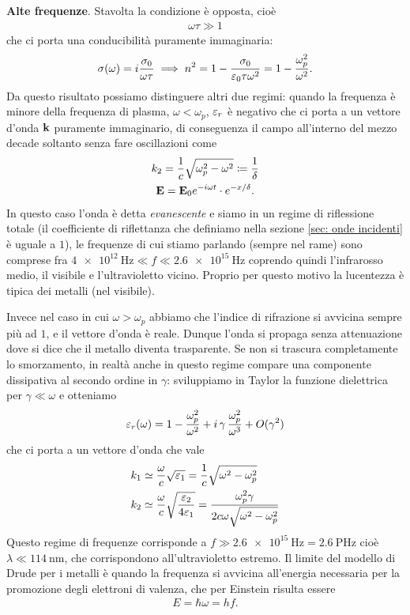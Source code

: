 \textbf{Alte frequenze}. Stavolta la condizione è opposta, cioè
\begin{align}
  \omega \tau \gg 1
\end{align}
che ci porta una conducibilità puramente immaginaria:
\begin{align}
  \sigma(\omega) = i \frac{\sigma_0}{\omega \tau} \implies n^2 = 1  - \frac{\sigma_0}{\varepsilon_0 \tau \omega^2} = 1 - \frac{\omega_p^2}{\omega^2}.
\end{align}
Da questo risultato possiamo distinguere altri due regimi: quando la frequenza è minore della frequenza di plasma, $ \omega < \omega_p $, $ \varepsilon_r $ è 
negativo che ci porta a un vettore d'onda $ \mathbf{k} $ puramente immaginario, di conseguenza il campo all'interno del mezzo decade soltanto senza fare 
oscillazioni come
\begin{gather}
  k_2 = \frac{1}{c} \sqrt{\omega_p^2 - \omega^2} \coloneq \frac{1}{\delta}
  \\
  \mathbf{E} = \mathbf{E}_0 e^{-i\omega t} \cdot e^{-x/\delta}.
\end{gather}
In questo caso l'onda è detta \textit{evanescente} e siamo in un regime di riflessione totale (il coefficiente di riflettanza che definiamo nella sezione 
\ref{sec: onde incidenti} è uguale a $ 1 $), le frequenze di cui stiamo parlando (sempre nel rame) sono comprese fra 
$ \SI{4e12}{\Hz} \ll f \ll \SI{2.6e15}{\Hz} $ coprendo quindi l'infrarosso medio, il visibile e l'ultravioletto vicino. Proprio per questo motivo la 
lucentezza è tipica dei metalli (nel visibile).

Invece nel caso in cui $ \omega > \omega_p $ abbiamo che l'indice di rifrazione si avvicina sempre più ad $ 1 $, e il vettore d'onda è reale. Dunque 
l'onda si propaga senza attenuazione dove si dice che il metallo diventa trasparente. Se non si trascura completamente lo smorzamento, in realtà 
anche in questo regime compare una componente dissipativa al secondo ordine in $ \gamma $: sviluppiamo in Taylor la funzione dielettrica per 
$ \gamma \ll \omega $ e otteniamo
\begin{align}
  \varepsilon_r(\omega) = 1 - \frac{\omega_p^2}{\omega^2} + i \, \gamma \,\frac{ \omega_p^2 }{\omega^3} + O(\gamma^2)
\end{align}
che ci porta a un vettore d'onda che vale
\begin{align}
  k_1 &\simeq \frac\omega{c} \sqrt{\varepsilon_1} = \frac{1}{c} \sqrt{\omega^2 - \omega_p^2}
  \\
  k_2 &\simeq \frac\omega{c} \sqrt{\frac{\varepsilon_2}{4\varepsilon_1}} = \frac{\omega_p^2 \gamma }{2c\omega \sqrt{\omega^2 - \omega_p^2}}
\end{align}
Questo regime di frequenze corrisponde a $ f \gg \SI{2.6e15}{\Hz} = \SI{2.6}{\peta \hertz} $ cioè $ \lambda \ll \SI{114}{\nm} $, che corrispondono 
all'ultravioletto estremo. Il limite del modello di Drude per i metalli è quando la frequenza si avvicina all'energia necessaria per la promozione 
degli elettroni di valenza, che per Einstein risulta essere 
\begin{align}
  E = \hbar \omega = h f.
\end{align}

